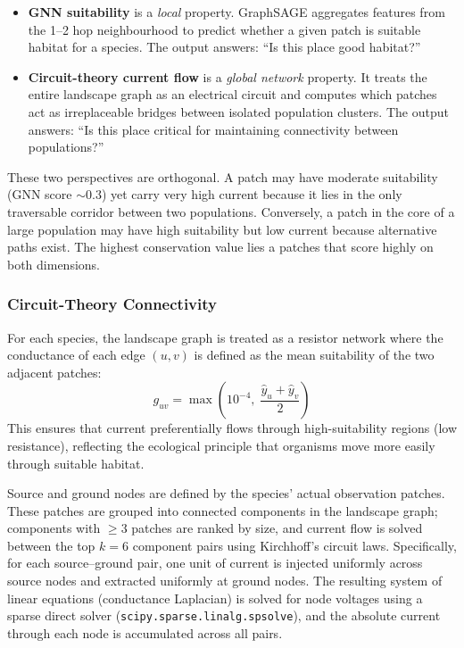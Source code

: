 \begin{itemize}
    \item \textbf{GNN suitability} is a \emph{local} property. GraphSAGE 
    aggregates features from the 1--2 hop neighbourhood to predict whether a 
    given patch is suitable habitat for a species. The output answers: 
    ``Is this place good habitat?''

    \item \textbf{Circuit-theory current flow} is a \emph{global network} 
    property. It treats the entire landscape graph as an electrical circuit 
    and computes which patches act as irreplaceable bridges between isolated 
    population clusters. The output answers: ``Is this place critical for 
    maintaining connectivity between populations?''
\end{itemize}

These two perspectives are orthogonal. A patch may have moderate suitability 
(GNN score ${\sim}0.3$) yet carry very high current because it lies in the only 
traversable corridor between two populations. Conversely, a patch in the core 
of a large population may have high suitability but low current because 
alternative paths exist. The highest conservation value lies a patches that score
highly on both dimensions.

\subsubsection{Circuit-Theory Connectivity}
\label{sec:circuit}

For each species, the landscape graph is treated as a resistor network where 
the conductance of each edge $(u, v)$ is defined as the mean suitability of 
the two adjacent patches:
\begin{equation}
    g_{uv} = \max\!\left( 10^{-4},\; 
        \frac{\hat{y}_u + \hat{y}_v}{2} 
    \right)
    \label{eq:conductance}
\end{equation}
This ensures that current preferentially flows through high-suitability regions 
(low resistance), reflecting the ecological principle that organisms move more 
easily through suitable habitat.

Source and ground nodes are defined by the species' actual observation patches. 
These patches are grouped into connected components in the landscape graph; 
components with $\geq 3$ patches are ranked by size, and current flow is solved 
between the top $k = 6$ component pairs using Kirchhoff's circuit laws. 
Specifically, for each source--ground pair, one unit of current is injected 
uniformly across source nodes and extracted uniformly at ground nodes. The 
resulting system of linear equations (conductance Laplacian) is solved for node 
voltages using a sparse direct solver (\texttt{scipy.sparse.linalg.spsolve}), 
and the absolute current through each node is accumulated across all pairs.

